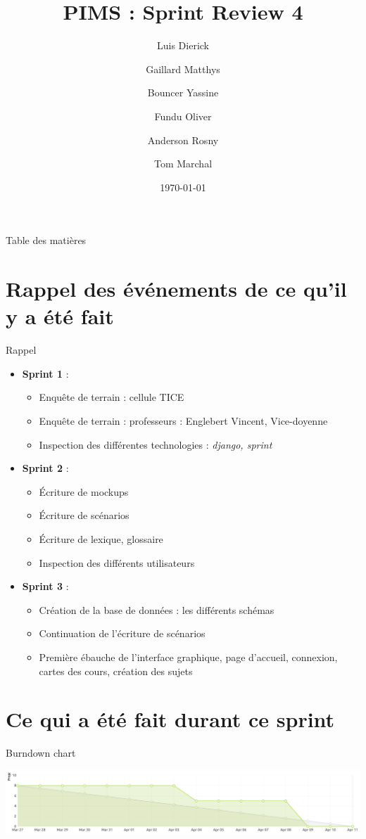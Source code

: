 \documentclass[numbering=fraction]{beamer}
\title{PIMS : Sprint Review 4}
\author[PIMS]{Luis Dierick \and Gaillard Matthys \and Bouncer Yassine \and Fundu Oliver \and Anderson Rosny \and Tom Marchal }
\institute{Université de Namur}
\date{\today}
\begin{document}
\begin{frame}[plain]{}
    \maketitle
\end{frame}

\begin{frame}{Table des matières}
    \tableofcontents
\end{frame}
\section{Rappel des événements de ce qu'il y a été fait}
\begin{frame}{Rappel}
    \begin{itemize}
        \item \textbf{Sprint 1} :
        \begin{itemize}
            \item Enquête de terrain : cellule TICE 
            \item Enquête de terrain : professeurs : Englebert Vincent, Vice-doyenne
            \item Inspection des différentes technologies : \textit{django, sprint}
        \end{itemize}
        \item \textbf{Sprint 2} : 
        \begin{itemize}
            \item Écriture de mockups
            \item Écriture de scénarios
            \item Écriture de lexique, glossaire
            \item Inspection des différents utilisateurs
        \end{itemize}
        \item \textbf{Sprint 3} :
        \begin{itemize}
            \item Création de la base de données : les différents schémas
            \item Continuation de l'écriture de scénarios
            \item Première ébauche de l'interface graphique, page d'accueil, connexion, cartes des cours, création des sujets
        \end{itemize}
    \end{itemize}
\end{frame}
\section{Ce qui a été fait durant ce sprint}
\begin{frame}{Burndown chart}
    \centering
    
    \includegraphics[width=1.1\textwidth]{burndownChart.png} 
\end{frame}
\end{document}
